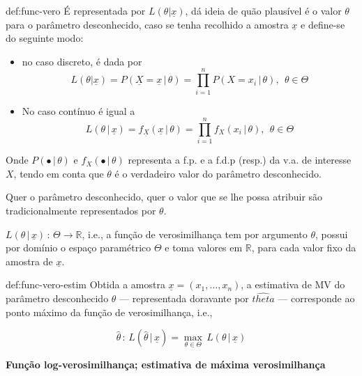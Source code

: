 \begin{theo}{def:func-vero}\label{def:func-vero}
    \noindent É representada por $L(\theta | \underline{x})$, dá ideia de quão plausível é o valor $\theta$ para o parâmetro desconhecido, caso se tenha recolhido a amostra $\underline{x}$ e define-se do seguinte modo:
    \begin{itemize}
        \item no caso discreto, é dada por
        $$
            L(\theta | \underline{x}) = P(\underline{X} = \underline{x}\,|\,\theta) = \prod_{i = 1}^n P(X = x_i\, |\, \theta),\;\, \theta \in \Theta
        $$

        \item No caso contínuo é igual a 
        $$
            L(\theta\, |\, \underline{x}) = f_{\underline{X}}(\underline{x}\, |\, \theta) = \prod_{i = 1}^n f_X(x_i\, |\, \theta),\;\, \theta \in \Theta
        $$
    \end{itemize}
    
    \noindent Onde $P(\bullet\,|\, \theta)$ e $f_X(\bullet\,|\, \theta)$ representa a f.p. e a f.d.p (resp.) da v.a. de interesse $X$, tendo em conta que $\theta$ é o verdadeiro valor do parâmetro desconhecido.
\end{theo}

\noindent Quer o parâmetro desconhecido, quer o valor que se lhe possa atribuir são tradicionalmente representados por $\theta$.

\vspace{1 em}
\noindent $L(\theta\, |\, \underline{x})\,:\, \Theta \to \mathbb{R}$, i.e., a função de verosimilhança tem por argumento $\theta$, possui por domínio o espaço paramétrico $\Theta$ e toma valores em $\mathbb{R}$, para cada valor fixo da amostra de $\underline{x}$.

\begin{theo}{def:func-vero-estim}\label{def:func-vero-estim}
    \noindent Obtida a amostra $\underline{x} = (x_1, \dots, x_n)$, a estimativa de MV do parâmetro desconhecido $\theta$ --- representada doravante por $\hat{theta}$ --- corresponde ao ponto máximo da função de verosimilhança, i.e.,

    $$
        \hat{\theta}\,:\, L(\hat{\theta}\,|\, \underline{x}) = \underset{\theta \in \Theta}{\max}\, L(\theta\,|\,\underline{x})
    $$
\end{theo}

\noindent\textbf{Função log-verosimilhança; estimativa de máxima verosimilhança}

